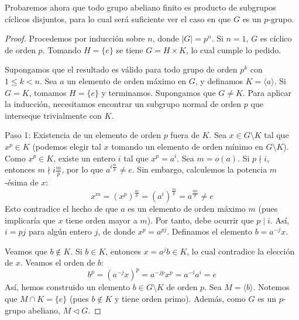Probaremos ahora que todo grupo abeliano finito es producto de subgrupos cíclicos disjuntos, para lo cual será suficiente ver el caso en que $G$ es un $p$-grupo.


\begin{proof}
Procedemos por inducción sobre $n$, donde $|G| = p^n$.
Si $n=1$, $G$ es cíclico de orden $p$. Tomando $H=\{e\}$ se tiene $G = H \times K$, lo cual cumple lo pedido.

Supongamos que el resultado es válido para todo grupo de orden $p^k$ con $1 \leq k < n$.
Sea $a$ un elemento de orden máximo en $G$, y definamos $K = \langle a \rangle$.
Si $G = K$, tomamos $H = \{e\}$ y terminamos.
Supongamos que $G \neq K$. Para aplicar la inducción, necesitamos encontrar un subgrupo normal de orden $p$ que interseque trivialmente con $K$.

Paso 1: Existencia de un elemento de orden $p$ fuera de $K$.
Sea $x \in G \setminus K$ tal que $x^p \in K$ (podemos elegir tal $x$ tomando un elemento de orden mínimo en $G \setminus K$).
Como $x^p \in K$, existe un entero $i$ tal que $x^p = a^i$.
Sea $m = o(a)$. Si $p \nmid i$, entonces $m \nmid i \frac{m}{p}$, por lo que $a^{i \frac{m}{p}} \neq e$.
Sin embargo, calculemos la potencia $m$-ésima de $x$:
\begin{equation*}
x^m = (x^p)^{\frac{m}{p}} = (a^i)^{\frac{m}{p}} = a^{\frac{im}{p}} \neq e
\end{equation*}
Esto contradice el hecho de que $a$ es un elemento de orden máximo $m$ (pues implicaría que $x$ tiene orden mayor a $m$).
Por tanto, debe ocurrir que $p \mid i$.
Así, $i = pj$ para algún entero $j$, de donde $x^p = a^{pj}$.
Definamos el elemento $b = a^{-j}x$.

Veamos que $b \notin K$. Si $b \in K$, entonces $x = a^j b \in K$, lo cual contradice la elección de $x$.
Veamos el orden de $b$:
\begin{equation*}
b^p = (a^{-j}x)^p = a^{-jp} x^p = a^{-i} a^i = e
\end{equation*}
Así, hemos construido un elemento $b \in G \setminus K$ de orden $p$.
Sea $M = \langle b \rangle$. Notemos que $M \cap K = \{e\}$ (pues $b \notin K$ y tiene orden primo). Además, como $G$ es un $p$-grupo abeliano, $M \triangleleft G$.


\end{proof}
